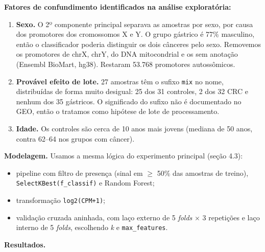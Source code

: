 \documentclass[11pt,a4paper]{article}
\providecommand{\tightlist}{\setlength{\itemsep}{0pt}\setlength{\parskip}{0pt}}
\begin{document}
\textbf{Fatores de confundimento identificados na análise exploratória:}

\begin{enumerate}
\def\labelenumi{\arabic{enumi}.}
\tightlist
\item
  \textbf{Sexo.} O 2º componente principal separava as amostras por sexo, por
  causa dos promotores dos cromossomos X e Y. O grupo gástrico é 77\% masculino,
  então o classificador poderia distinguir os dois cânceres pelo sexo. Removemos
  os promotores de chrX, chrY, do DNA mitocondrial e os sem anotação (Ensembl
  BioMart, hg38). Restaram 53.768 promotores autossômicos.
\item
  \textbf{Provável efeito de lote.} 27 amostras têm o sufixo \texttt{mix} no
  nome, distribuídas de forma muito desigual: 25 dos 31 controles, 2 dos 32 CRC
  e nenhum dos 35 gástricos. O significado do sufixo não é documentado no GEO,
  então o tratamos como hipótese de lote de processamento.
\item
  \textbf{Idade.} Os controles são cerca de 10 anos mais jovens (mediana de 50
  anos, contra 62--64 nos grupos com câncer).
\end{enumerate}

\textbf{Modelagem.} Usamos a mesma lógica do experimento principal (seção 4.3):

\begin{itemize}
\tightlist
\item
  pipeline com filtro de presença (sinal em $\geq$ 50\% das amostras de treino),
  \texttt{SelectKBest(f\_classif)} e Random Forest;
\item
  transformação \texttt{log2(CPM+1)};
\item
  validação cruzada aninhada, com laço externo de 5 \emph{folds} $\times$ 3 repetições
  e laço interno de 5 \emph{folds}, escolhendo \emph{k} e
  \texttt{max\_features}.
\end{itemize}

\textbf{Resultados.}
\end{document}
